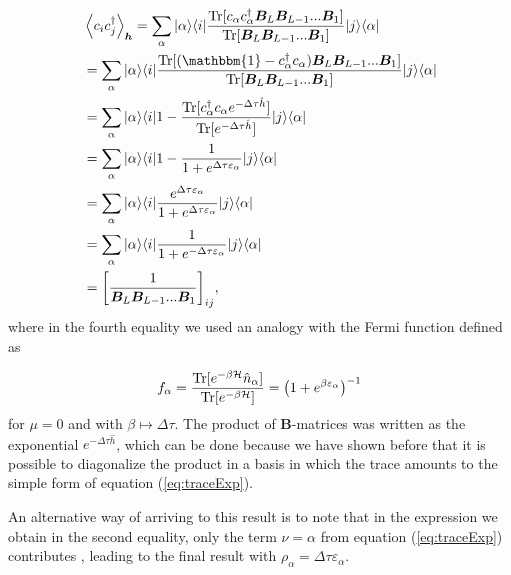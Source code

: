 \begin{equation}
\begin{split}
&\left\langle c_i c_j^\dagger \right\rangle_{\bm h} =\sum_{\alpha} | \alpha \rangle \langle i | \frac{ \Tr[c_{\alpha} c_\alpha^\dagger \bm B_L \bm B_{L-1} ... \bm B_1] }{\Tr [\bm B_L \bm B_{L-1} ... \bm B_1] } | j \rangle \langle \alpha | \\
&=\sum_{\alpha} | \alpha \rangle \langle i | \frac{ \Tr [( \mathbbm{1} - c_{\alpha}^\dagger c_\alpha) \bm B_L \bm B_{L-1} ... \bm B_1] }{\Tr [\bm B_L \bm B_{L-1} ... \bm B_1] } | j \rangle \langle \alpha | \\
&= \sum_{\alpha} | \alpha \rangle \langle i | 1 -  \frac{ \Tr [c_{\alpha}^\dagger c_\alpha e^{-\Delta \tau \hat{h}}]}{\Tr [e^{-\Delta \tau \hat{h}}] } | j \rangle \langle \alpha | \\
&= \sum_{\alpha} | \alpha \rangle \langle i | 1 -  \frac{1}{1 + e^{\Delta\tau \varepsilon_\alpha}} | j \rangle \langle \alpha | \\
&= \sum_{\alpha} | \alpha \rangle \langle i | \frac{e^{\Delta\tau \varepsilon_\alpha}}{1 + e^{\Delta\tau \varepsilon_\alpha}} | j \rangle \langle \alpha | \\
&= \sum_{\alpha} | \alpha \rangle \langle i | \frac{1}{1 + e^{-\Delta\tau \varepsilon_\alpha}} | j \rangle \langle \alpha | \\
&= \bigg[ \frac{1}{\bm B_L \bm B_{L-1} ... \bm B_{1}} \bigg]_{ij} ,
\end{split}
\end{equation}
where in the fourth equality we used an analogy with the Fermi function defined as 

\begin{equation}
f_\alpha = \frac{\operatorname{Tr}[e^{-\beta\mathcal{H}} \hat{n}_\alpha]}{\operatorname{Tr}[e^{-\beta\mathcal{H}} ]} = \big(1 + e^{\beta\varepsilon_\alpha} \big)^{-1}
\end{equation}
for $\mu = 0$ and with $\beta \mapsto \Delta \tau$. The product of $\bm B$-matrices was written as the exponential $e^{-\Delta \tau \hat{h}}$, which can be done because we have shown before that it is possible to diagonalize the product in a basis in which the trace amounts to the simple form of equation (\ref{eq:traceExp}).

An alternative way of arriving to this result is to note that in the expression we obtain in the second equality, only the term $\nu = \alpha$ from equation (\ref{eq:traceExp}) contributes \cite{Santos2003}, leading to the final result with $\rho_\alpha = \Delta\tau \varepsilon_\alpha$.

